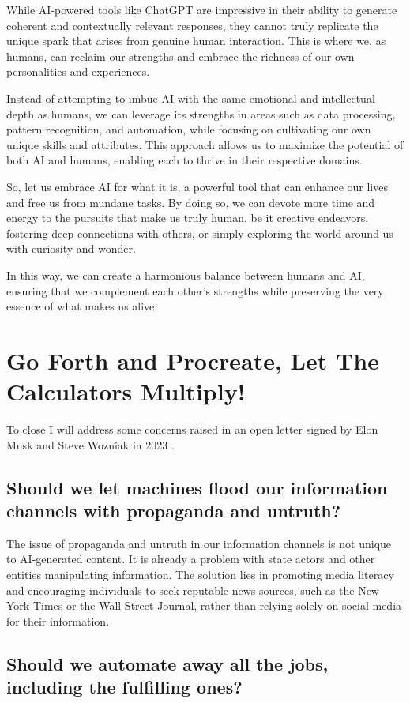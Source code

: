 While AI-powered tools like ChatGPT are impressive in their ability to generate coherent and contextually relevant responses, they cannot truly replicate the unique spark that arises from genuine human interaction. This is where we, as humans, can reclaim our strengths and embrace the richness of our own personalities and experiences.

Instead of attempting to imbue AI with the same emotional and intellectual depth as humans, we can leverage its strengths in areas such as data processing, pattern recognition, and automation, while focusing on cultivating our own unique skills and attributes. This approach allows us to maximize the potential of both AI and humans, enabling each to thrive in their respective domains.

So, let us embrace AI for what it is, a powerful tool that can enhance our lives and free us from mundane tasks. By doing so, we can devote more time and energy to the pursuits that make us truly human, be it creative endeavors, fostering deep connections with others, or simply exploring the world around us with curiosity and wonder.

In this way, we can create a harmonious balance between humans and AI, ensuring that we complement each other's strengths while preserving the very essence of what makes us alive.

\section{Go Forth and Procreate, Let The Calculators Multiply!}

To close I will address some concerns raised in an open letter signed by Elon Musk and Steve Wozniak in 2023 \cite{dumbestletter}. 

\subsection{Should we let machines flood our information channels with propaganda and untruth?}

The issue of propaganda and untruth in our information channels is not unique to AI-generated content. It is already a problem with state actors and other entities manipulating information. The solution lies in promoting media literacy and encouraging individuals to seek reputable news sources, such as the New York Times or the Wall Street Journal, rather than relying solely on social media for their information.

\subsection{Should we automate away all the jobs, including the fulfilling ones?}

